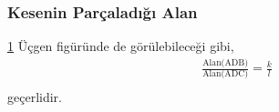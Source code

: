 \subsubsection{Kesenin Parçaladığı Alan}
\begin{figure}[h!]
    \centering
    \caption{}
    \label{fig:secareapartitioning}
\end{figure}

\ref{fig:secareapartitioning} Üçgen figüründe de görülebileceği gibi, 
\begin{equation}
    \begin{aligned}
    \frac{\text{Alan(ADB)}}{\text{Alan(ADC)}} = \frac{k}{l} \\
    \end{aligned}
\end{equation}
geçerlidir.
